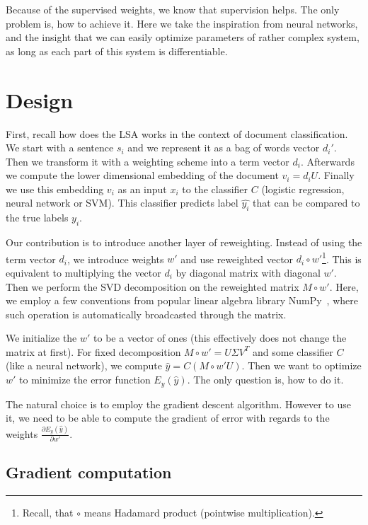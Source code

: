     Because of the supervised weights, we know that supervision helps. 
    The only problem is, how to achieve it. 
    Here we take the inspiration from neural networks, and the insight that we can easily optimize parameters of rather complex system, as long as each part of this system is differentiable. 

\section{Design} \label{sec:design}

    First, recall how does the LSA works in the context of document classification.
    We start with a sentence $s_i$ and we represent it as a bag of words vector $d_i'$. 
    Then we transform it with a weighting scheme into a term vector $d_i$.
    Afterwards we compute the lower dimensional embedding of the document $v_i = d_i U$. 
    Finally we use this embedding $v_i$ as an input $x_i$ to the classifier $C$ (logistic regression, neural network or SVM).
    This classifier predicts label $\hat{y_i}$ that can be compared to
    the true labels $y_i$.
    
    Our contribution is to introduce another layer of reweighting. 
    Instead of using the term vector $d_i$, we introduce weights $w'$ and use reweighted vector $d_i \circ w'$\footnote{Recall, that $\circ$ means Hadamard product (pointwise multiplication).}.
    This is equivalent to multiplying the vector $d_i$ by diagonal matrix with diagonal $w'$.
    Then we perform the SVD decomposition on the reweighted matrix $M \circ w'$. 
    Here, we employ a few conventions from popular linear algebra library NumPy~\cite{oliphant2006guide}, 
    where such operation is automatically broadcasted through the matrix.
    
    We initialize the $w'$ to be a vector of ones (this effectively does not change the matrix at first).
    For fixed decomposition $M\circ w'= U\Sigma V^T$ and some classifier $C$ (like a neural network),
    we compute $\hat{y} = C(M \circ w' U)$.
    Then we want to optimize $w'$ to minimize the error function $E_y(\hat{y})$.
    The only question is, how to do it.
    
    The natural choice is to employ the gradient descent algorithm. 
    However to use it, we need to be able to compute the gradient of error with regards to the weights $\frac{\partial E_y(\hat{y})}{\partial w'}$.
    
    \subsection{Gradient computation}
    
